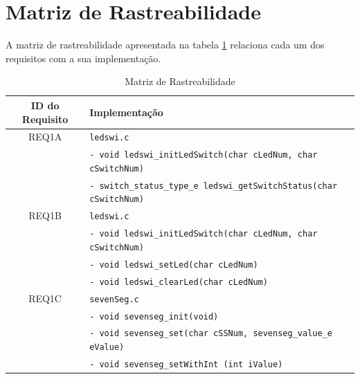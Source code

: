 \documentclass{article}
\begin{document}
\section{Matriz de Rastreabilidade}
A matriz de rastreabilidade apresentada na tabela \ref*{tab:rastreabilidade} relaciona cada um dos requisitos com a sua implementação.
\begin{table}[H]
	\centering
	\caption{Matriz de Rastreabilidade}
	\label{tab:rastreabilidade}
	\small
	\begin{tabular}{|c|l|}
		\hline \bfseries{ID do Requisito} & \bfseries{Implementação}\\ 
		\hline REQ1A 	& \texttt{ledswi.c}\\ 
						& \texttt{- void ledswi\_initLedSwitch(char cLedNum, char cSwitchNum)}\\
						& \texttt{- switch\_status\_type\_e ledswi\_getSwitchStatus(char cSwitchNum)}\\
		\hline REQ1B 	& \texttt{ledswi.c}\\ 
						& \texttt{- void ledswi\_initLedSwitch(char cLedNum, char cSwitchNum)}\\
						& \texttt{- void ledswi\_setLed(char cLedNum)}\\ 
						& \texttt{- void ledswi\_clearLed(char cLedNum)}\\
		\hline REQ1C 	& \texttt{sevenSeg.c}\\ 
						& \texttt{- void sevenseg\_init(void)}\\
						& \texttt{- void sevenseg\_set(char cSSNum, sevenseg\_value\_e eValue)}\\
						& \texttt{- void sevenseg\_setWithInt (int iValue)}\\
		\hline 
	\end{tabular} 
	\normalsize
\end{table}
\end{document}
